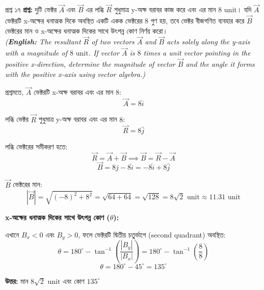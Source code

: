 \documentclass[11pt,a4paper]{article}
\begin{document}
\begin{qbox}{প্রশ্ন ১৭}
\textbf{প্রশ্ন:} দুটি ভেক্টর $\vec{A}$ এবং $\vec{B}$ এর লব্ধি $\vec{R}$ শুধুমাত্র y-অক্ষ বরাবর কাজ করে এবং এর মান $8\text{ unit}$। যদি $\vec{A}$ ভেক্টরটি x-অক্ষের ধনাত্মক দিকে অবস্থিত একটি একক ভেক্টরের $8$ গুণ হয়, তবে ভেক্টর বীজগণিত ব্যবহার করে $\vec{B}$ ভেক্টরের মান ও x-অক্ষের ধনাত্মক দিকের সাথে উৎপন্ন কোণ নির্ণয় করো। \\
\textit{(\textbf{English:} The resultant $\vec{R}$ of two vectors $\vec{A}$ and $\vec{B}$ acts solely along the y-axis with a magnitude of $8\text{ unit}$. If vector $\vec{A}$ is $8$ times a unit vector pointing in the positive x-direction, determine the magnitude of vector $\vec{B}$ and the angle it forms with the positive x-axis using vector algebra.)}
\end{qbox}

\begin{solbox}
\begin{center}
\end{center}

প্রশ্নমতে, $\vec{A}$ ভেক্টরটি x-অক্ষ বরাবর এবং এর মান $8$:
$$\vec{A} = 8\hat{i}$$

লব্ধি ভেক্টর $\vec{R}$ শুধুমাত্র y-অক্ষ বরাবর এবং এর মান $8$:
$$\vec{R} = 8\hat{j}$$

লব্ধি ভেক্টরের সমীকরণ হতে:
$$\vec{R} = \vec{A} + \vec{B} \implies \vec{B} = \vec{R} - \vec{A}$$
$$\vec{B} = 8\hat{j} - 8\hat{i} = -8\hat{i} + 8\hat{j}$$

$\vec{B}$ ভেক্টরের মান:
$$|\vec{B}| = \sqrt{(-8)^2 + 8^2} = \sqrt{64 + 64} = \sqrt{128} = 8\sqrt{2}\text{ unit} \approx 11.31\text{ unit}$$

\textbf{x-অক্ষের ধনাত্মক দিকের সাথে উৎপন্ন কোণ ($\theta$):}

এখানে $B_x < 0$ এবং $B_y > 0$, ফলে ভেক্টরটি দ্বিতীয় চতুর্ভাগে (second quadrant) অবস্থিত:
$$\theta = 180^\circ - \tan^{-1}\left(\frac{|B_y|}{|B_x|}\right) = 180^\circ - \tan^{-1}\left(\frac{8}{8}\right)$$
$$\theta = 180^\circ - 45^\circ = 135^\circ$$

\textbf{উত্তর:} মান $8\sqrt{2}\text{ unit}$ এবং কোণ $135^\circ$
\end{solbox}
\end{document}
